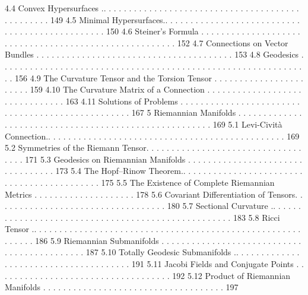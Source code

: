 \documentclass[a4paper,10pt]{article}
\begin{document}
4.4 Convex Hypersurfaces .. . . . . . . . . . . . . . . . . . . . . . . . . . . . . . . . . . . . . . . . . . . . . . . . 149
4.5 Minimal Hypersurfaces.. . . . . . . . . . . . . . . . . . . . . . . . . . . . . . . . . . . . . . . . . . . . . . . 150
4.6 Steiner’s Formula . . . . . . . . . . . . . . . . . . . . . . . . . . . . . . . . . . . . . . . . . . . . . . . . . . . . . . 152
4.7 Connections on Vector Bundles . . . . . . . . . . . . . . . . . . . . . . . . . . . . . . . . . . . . . . . 153
4.8 Geodesics . . . . . . . . . . . . . . . . . . . . . . . . . . . . . . . . . . . . . . . . . . . . . . . . . . . . . . . . . . . . . . 156
4.9 The Curvature Tensor and the Torsion Tensor . . . . . . . . . . . . . . . . . . . . . . . 159
4.10 The Curvature Matrix of a Connection . . . . . . . . . . . . . . . . . . . . . . . . . . . . . . . 163
4.11 Solutions of Problems . . . . . . . . . . . . . . . . . . . . . . . . . . . . . . . . . . . . . . . . . . . . . . . . . 167
5 Riemannian Manifolds . . . . . . . . . . . . . . . . . . . . . . . . . . . . . . . . . . . . . . . . . . . . . . . . . . . . . . 169
5.1 Levi-Cività Connection.. . . . . . . . . . . . . . . . . . . . . . . . . . . . . . . . . . . . . . . . . . . . . . . 169
5.2 Symmetries of the Riemann Tensor. . . . . . . . . . . . . . . . . . . . . . . . . . . . . . . . . . . 171
5.3 Geodesics on Riemannian Manifolds . . . . . . . . . . . . . . . . . . . . . . . . . . . . . . . . . 173
5.4 The Hopf–Rinow Theorem.. . . . . . . . . . . . . . . . . . . . . . . . . . . . . . . . . . . . . . . . . . . 175
5.5 The Existence of Complete Riemannian Metrics . . . . . . . . . . . . . . . . . . . . 178
5.6 Covariant Differentiation of Tensors. . . . . . . . . . . . . . . . . . . . . . . . . . . . . . . . . . 180
5.7 Sectional Curvature .. . . . . . . . . . . . . . . . . . . . . . . . . . . . . . . . . . . . . . . . . . . . . . . . . . . 183
5.8 Ricci Tensor .. . . . . . . . . . . . . . . . . . . . . . . . . . . . . . . . . . . . . . . . . . . . . . . . . . . . . . . . . . . 186
5.9 Riemannian Submanifolds . . . . . . . . . . . . . . . . . . . . . . . . . . . . . . . . . . . . . . . . . . . . 187
5.10 Totally Geodesic Submanifolds .. . . . . . . . . . . . . . . . . . . . . . . . . . . . . . . . . . . . . . 191
5.11 Jacobi Fields and Conjugate Points . . . . . . . . . . . . . . . . . . . . . . . . . . . . . . . . . . . 192
5.12 Product of Riemannian Manifolds . . . . . . . . . . . . . . . . . . . . . . . . . . . . . . . . . . . . 197
\end{document}
